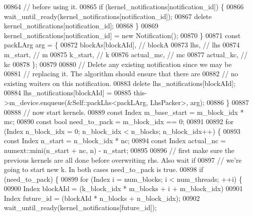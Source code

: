 \begin{DoxyCode}
{00864             \textcolor{comment}{// before using it.}
00865             \textcolor{keywordflow}{if} (kernel\_notifications[notification\_id]) \{
00866               wait\_until\_ready(kernel\_notifications[notification\_id]);
00867               \textcolor{keyword}{delete} kernel\_notifications[notification\_id];
00868             \}
00869             kernel\_notifications[notification\_id] = \textcolor{keyword}{new} Notification();
00870           \}
00871           \textcolor{keyword}{const} packLArg arg = \{
00872             blockAs[blockAId], \textcolor{comment}{// blockA}
00873             lhs,        \textcolor{comment}{// lhs}
00874             m\_start,    \textcolor{comment}{// m}
00875             k\_start,    \textcolor{comment}{// k}
00876             actual\_mc,  \textcolor{comment}{// mc}
00877             actual\_kc,  \textcolor{comment}{// kc}
00878           \};
00879 
00880           \textcolor{comment}{// Delete any existing notification since we may be}
00881           \textcolor{comment}{// replacing it.  The algorithm should ensure that there are}
00882           \textcolor{comment}{// no existing waiters on this notification.}
00883           \textcolor{keyword}{delete} lhs\_notifications[blockAId];
00884           lhs\_notifications[blockAId] =
00885           this->m\_device.enqueue(&Self::packLhs<packLArg, LhsPacker>, arg);
00886         \}
00887 
00888         \textcolor{comment}{// now start kernels.}
00889         \textcolor{keyword}{const} Index m\_base\_start = m\_block\_idx * mc;
00890         \textcolor{keyword}{const} \textcolor{keywordtype}{bool} need\_to\_pack = m\_block\_idx == 0;
00891 
00892         \textcolor{keywordflow}{for} (Index n\_block\_idx = 0; n\_block\_idx < n\_blocks; n\_block\_idx++) \{
00893           \textcolor{keyword}{const} Index n\_start = n\_block\_idx * nc;
00894           \textcolor{keyword}{const} Index actual\_nc = numext::mini(n\_start + nc, n) - n\_start;
00895 
00896           \textcolor{comment}{// first make sure the previous kernels are all done before overwriting rhs. Also wait if}
00897           \textcolor{comment}{// we're going to start new k. In both cases need\_to\_pack is true.}
00898           \textcolor{keywordflow}{if} (need\_to\_pack) \{
00899             \textcolor{keywordflow}{for} (Index i = num\_blocks; i < num\_threads; ++i) \{
00900               Index blockAId = (k\_block\_idx * m\_blocks + i + m\_block\_idx) %
00901               Index future\_id = (blockAId * n\_blocks + n\_block\_idx);
00902               wait\_until\_ready(kernel\_notifications[future\_id]);
}
\end{DoxyCode}
